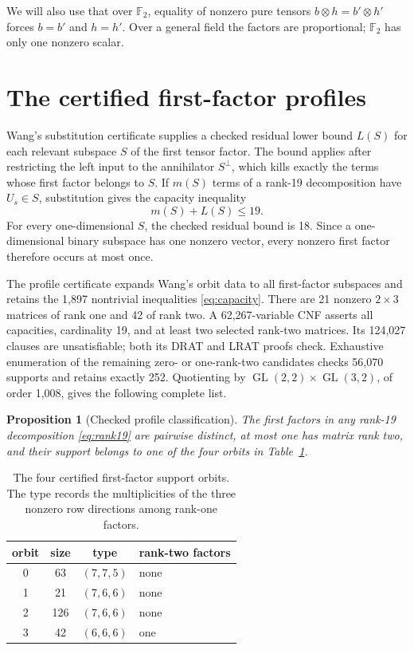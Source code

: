 \documentclass[10pt]{article}
\newtheorem{proposition}[theorem]{Proposition}
\theoremstyle{remark}
\newcommand{\F}{\mathbb F}
\newcommand{\GL}{\operatorname{GL}}
\begin{document}
We will also use that over $\F_2$, equality of nonzero pure tensors
$b\otimes h=b'\otimes h'$ forces $b=b'$ and $h=h'$.  Over a general field the
factors are proportional; $\F_2$ has only one nonzero scalar.

\section{The certified first-factor profiles}

Wang's substitution certificate supplies a checked residual lower bound
$L(S)$ for each relevant subspace $S$ of the first tensor factor.  The bound
applies after restricting the left input to the annihilator $S^\perp$, which
kills exactly the terms whose first factor belongs to $S$.  If $m(S)$ terms of
a rank-19 decomposition have $U_s\in S$, substitution gives the capacity
inequality
\begin{equation}\label{eq:capacity}
 m(S)+L(S)\leq19.
\end{equation}
For every one-dimensional $S$, the checked residual bound is 18.  Since a
one-dimensional binary subspace has one nonzero vector, every nonzero first
factor therefore occurs at most once.

The profile certificate expands Wang's orbit data to all first-factor
subspaces and retains the 1,897 nontrivial inequalities
\eqref{eq:capacity}.  There are 21 nonzero $2\times3$ matrices of rank one and
42 of rank two.  A 62,267-variable CNF asserts all capacities, cardinality 19,
and at least two selected rank-two matrices.  Its 124,027 clauses are
unsatisfiable; both its DRAT and LRAT proofs check.  Exhaustive enumeration of
the remaining zero- or one-rank-two candidates checks 56,070 supports and
retains exactly 252.  Quotienting by
$\GL(2,2)\times\GL(3,2)$, of order 1,008, gives the following complete list.

\begin{proposition}[Checked profile classification]\label{prop:profiles}
The first factors in any rank-19 decomposition \eqref{eq:rank19} are pairwise
distinct, at most one has matrix rank two, and their support belongs to one of
the four orbits in Table~\ref{tab:profiles}.
\end{proposition}

\begin{table}[ht]
\centering
\caption{The four certified first-factor support orbits.  The type records the
multiplicities of the three nonzero row directions among rank-one factors.}
\label{tab:profiles}
\begin{tabular}{@{}cccl@{}}
\toprule
orbit & size & type & rank-two factors \\
\midrule
0 & 63  & $(7,7,5)$ & none \\
1 & 21  & $(7,6,6)$ & none \\
2 & 126 & $(7,6,6)$ & none \\
3 & 42  & $(6,6,6)$ & one \\
\bottomrule
\end{tabular}
\end{table}
\end{document}
